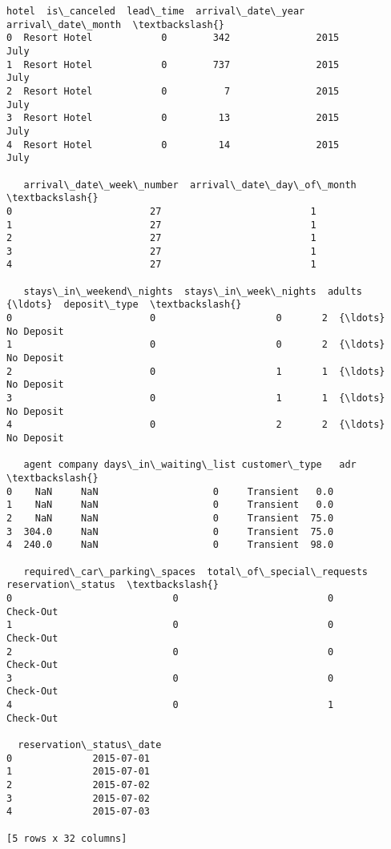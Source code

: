 \documentclass[11pt]{article}
\makeatletter
\newcommand{\boxspacing}{\kern\kvtcb@left@rule\kern\kvtcb@boxsep}
\newcommand{\prompt}[4]{
        {\ttfamily\llap{{\color{#2}[#3]:\hspace{3pt}#4}}\vspace{-\baselineskip}}
    }
\makeatother
\begin{document}
            \begin{tcolorbox}[breakable, size=fbox, boxrule=.5pt, pad at break*=1mm, opacityfill=0]
\prompt{Out}{outcolor}{11}{\boxspacing}
\begin{Verbatim}[commandchars=\\\{\}]
          hotel  is\_canceled  lead\_time  arrival\_date\_year arrival\_date\_month  \textbackslash{}
0  Resort Hotel            0        342               2015               July
1  Resort Hotel            0        737               2015               July
2  Resort Hotel            0          7               2015               July
3  Resort Hotel            0         13               2015               July
4  Resort Hotel            0         14               2015               July

   arrival\_date\_week\_number  arrival\_date\_day\_of\_month  \textbackslash{}
0                        27                          1
1                        27                          1
2                        27                          1
3                        27                          1
4                        27                          1

   stays\_in\_weekend\_nights  stays\_in\_week\_nights  adults  {\ldots}  deposit\_type  \textbackslash{}
0                        0                     0       2  {\ldots}    No Deposit
1                        0                     0       2  {\ldots}    No Deposit
2                        0                     1       1  {\ldots}    No Deposit
3                        0                     1       1  {\ldots}    No Deposit
4                        0                     2       2  {\ldots}    No Deposit

   agent company days\_in\_waiting\_list customer\_type   adr  \textbackslash{}
0    NaN     NaN                    0     Transient   0.0
1    NaN     NaN                    0     Transient   0.0
2    NaN     NaN                    0     Transient  75.0
3  304.0     NaN                    0     Transient  75.0
4  240.0     NaN                    0     Transient  98.0

   required\_car\_parking\_spaces  total\_of\_special\_requests  reservation\_status  \textbackslash{}
0                            0                          0           Check-Out
1                            0                          0           Check-Out
2                            0                          0           Check-Out
3                            0                          0           Check-Out
4                            0                          1           Check-Out

  reservation\_status\_date
0              2015-07-01
1              2015-07-01
2              2015-07-02
3              2015-07-02
4              2015-07-03

[5 rows x 32 columns]
\end{Verbatim}
\end{tcolorbox}
        
\end{document}
